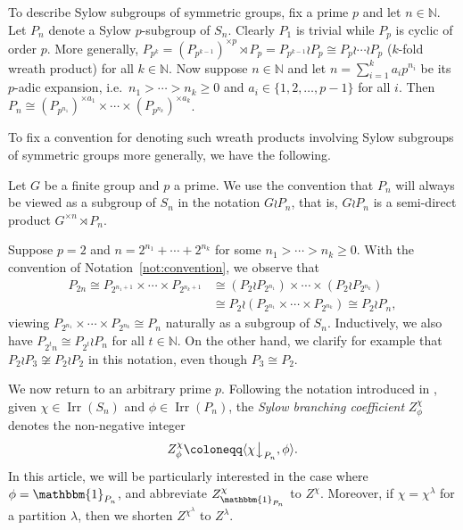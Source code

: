 \documentclass[ALCO, Unicode]{cedram}
\newcommand{\triv}{\mathbbm{1}}
\newcommand{\Irr}{\operatorname{Irr}}
\newcommand{\down}{\big\downarrow}
\newcommand{\N}{\mathbb{N}}
\begin{document}
To describe Sylow subgroups of symmetric groups, fix a prime $p$ and let $n\in\N$. Let $P_n$ denote a Sylow $p$-subgroup of $S_n$. Clearly $P_1$ is trivial while $P_p$ is cyclic of order $p$. More generally, $P_{p^k}= (P_{p^{k-1}})^{\times p}\rtimes P_p=P_{p^{k-1}}\wr P_p\cong P_p\wr \cdots \wr P_p$ ($k$-fold wreath product) for all $k\in\N$. Now suppose $n\in\N$ and let $n=\sum_{i=1}^k a_ip^{n_i}$ be its $p$-adic expansion, i.e.~$n_1>\cdots>n_k\ge 0$ and $a_i\in\{1,2,\dotsc,p-1\}$ for all $i$. Then $P_n\cong (P_{p^{n_1}})^{\times a_1}\times\cdots\times (P_{p^{n_k}})^{\times a_k}$. 

To fix a convention for denoting such wreath products involving Sylow subgroups of symmetric groups more generally, we have the following.

\begin{notation}\label{not:convention}
	Let $G$ be a finite group and $p$ a prime. We use the convention that $P_n$ will always be viewed as a subgroup of $S_n$ in the notation $G\wr P_n$, that is, $G\wr P_n$ is a semi-direct product $G^{\times n}\rtimes P_n$. 
\end{notation}

\begin{remark}\label{rem:convention}
	Suppose $p=2$ and $n=2^{n_1}+\cdots+2^{n_k}$ for some $n_1>\cdots>n_k\ge 0$. With the convention of Notation~\ref{not:convention}, we observe that 
	\begin{align*}
		P_{2n} \cong P_{2^{n_1+1}}\times\cdots\times P_{2^{n_k+1}} &\cong (P_2\wr P_{2^{n_1}})\times\cdots\times (P_2\wr P_{2^{n_k}})\\
		&\cong P_2 \wr (P_{2^{n_1}}\times \cdots \times P_{2^{n_k}})\cong P_2 \wr P_n,
	\end{align*}
	viewing $P_{2^{n_1}}\times \cdots \times P_{2^{n_k}}\cong P_n$ naturally as a subgroup of $S_n$. Inductively, we also have $P_{2^tn}\cong P_{2^t}\wr P_n$ for all $t\in\N$.
	On the other hand, we clarify for example that $P_2\wr P_3 \not\cong P_2\wr P_2$ in this notation, even though $P_3\cong P_2$.%
\end{remark}

We now return to an arbitrary prime $p$. Following the notation introduced in \cite{GL2}, given $\chi\in\Irr(S_n)$ and $\phi\in\Irr(P_n)$, the \textit{Sylow branching coefficient} $Z^\chi_\phi$ denotes the non-negative integer
\[ Z^\chi_\phi\coloneqq \langle \chi\down_{P_n}, \phi\rangle. \]
In this article, we will be particularly interested in the case where $\phi=\triv_{P_n}$, and abbreviate $Z^\chi_{\triv_{P_n}}$ to $Z^\chi$. Moreover, if $\chi=\chi^\lambda$ for a partition $\lambda$, then we shorten $Z^{\chi^\lambda}$ to $Z^\lambda$. 
\end{document}
